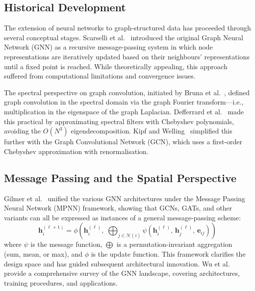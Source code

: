 \subsection{Historical Development}
\label{sec:gnn_history}

The extension of neural networks to graph-structured data has proceeded
through several conceptual stages.  Scarselli et
al.~\cite{scarselli2009graph} introduced the original Graph Neural
Network (GNN) as a recursive message-passing system in which node
representations are iteratively updated based on their neighbours'
representations until a fixed point is reached.  While theoretically
appealing, this approach suffered from computational limitations and
convergence issues.

The spectral perspective on graph convolution, initiated by Bruna et
al.~\cite{bruna2014spectral}, defined graph convolution in the spectral
domain via the graph Fourier transform---i.e., multiplication in the
eigenspace of the graph Laplacian.  Defferrard et
al.~\cite{defferrard2016convolutional} made this practical by
approximating spectral filters with Chebyshev polynomials, avoiding the
$O(N^3)$ eigendecomposition.  Kipf and
Welling~\cite{kipf2017semi} simplified this further with the Graph
Convolutional Network (GCN), which uses a first-order Chebyshev
approximation with renormalisation.

\subsection{Message Passing and the Spatial Perspective}
\label{sec:mpnn}

Gilmer et al.~\cite{gilmer2017neural} unified the various GNN
architectures under the Message Passing Neural Network (MPNN) framework,
showing that GCNs, GATs, and other variants can all be expressed as
instances of a general message-passing scheme:
\begin{equation}
\mathbf{h}_i^{(\ell+1)} = \phi\!\left(\mathbf{h}_i^{(\ell)},\;
\bigoplus_{j \in \mathcal{N}(i)} \psi\!\left(\mathbf{h}_i^{(\ell)},\,
\mathbf{h}_j^{(\ell)},\, \mathbf{e}_{ij}\right)\right)
\label{eq:mpnn}
\end{equation}
where $\psi$ is the message function, $\bigoplus$ is a permutation-invariant
aggregation (sum, mean, or max), and $\phi$ is the update function.  This
framework clarifies the design space and has guided subsequent
architectural innovation.  Wu et al.~\cite{wu2020comprehensive} provide
a comprehensive survey of the GNN landscape, covering architectures,
training procedures, and applications.

